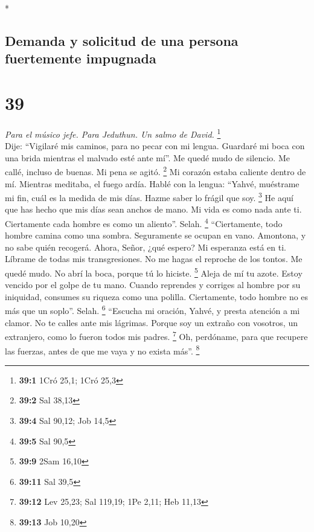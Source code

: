 \begin{paracol}{2}
\switchcolumn[0]*

\hypertarget{demanda-y-solicitud-de-una-persona-fuertemente-impugnada}{%
\subsection{Demanda y solicitud de una persona fuertemente
impugnada}\label{demanda-y-solicitud-de-una-persona-fuertemente-impugnada}}

\hypertarget{section-76}{%
\section{39}\label{section-76}}

\emph{Para el músico jefe. Para Jeduthun. Un salmo de David.}
\footnote{\textbf{39:1} 1Cró 25,1; 1Cró 25,3}\\
 Dije: ``Vigilaré mis caminos, para no pecar con mi
lengua. Guardaré mi boca con una brida mientras el malvado esté ante
mí''.  Me quedé mudo de silencio. Me callé, incluso de
buenas. Mi pena se agitó. \footnote{\textbf{39:2} Sal 38,13}
 Mi corazón estaba caliente dentro de mí. Mientras
meditaba, el fuego ardía. Hablé con la lengua:  ``Yahvé,
muéstrame mi fin, cuál es la medida de mis días. Hazme saber lo frágil
que soy. \footnote{\textbf{39:4} Sal 90,12; Job 14,5}  He
aquí que has hecho que mis días sean anchos de mano. Mi vida es como
nada ante ti. Ciertamente cada hombre es como un aliento''. Selah.
\footnote{\textbf{39:5} Sal 90,5}  ``Ciertamente, todo
hombre camina como una sombra. Seguramente se ocupan en vano. Amontona,
y no sabe quién recogerá.  Ahora, Señor, ¿qué espero? Mi
esperanza está en ti.  Líbrame de todas mis
transgresiones. No me hagas el reproche de los tontos.  Me
quedé mudo. No abrí la boca, porque tú lo hiciste. \footnote{\textbf{39:9}
  2Sam 16,10}  Aleja de mí tu azote. Estoy vencido por el
golpe de tu mano.  Cuando reprendes y corriges al hombre
por su iniquidad, consumes su riqueza como una polilla. Ciertamente,
todo hombre no es más que un soplo''. Selah. \footnote{\textbf{39:11}
  Sal 39,5}  ``Escucha mi oración, Yahvé, y presta
atención a mi clamor. No te calles ante mis lágrimas. Porque soy un
extraño con vosotros, un extranjero, como lo fueron todos mis padres.
\footnote{\textbf{39:12} Lev 25,23; Sal 119,19; 1Pe 2,11; Heb 11,13}
 Oh, perdóname, para que recupere las fuerzas, antes de
que me vaya y no exista más''. \footnote{\textbf{39:13} Job 10,20}


\end{paracol}
